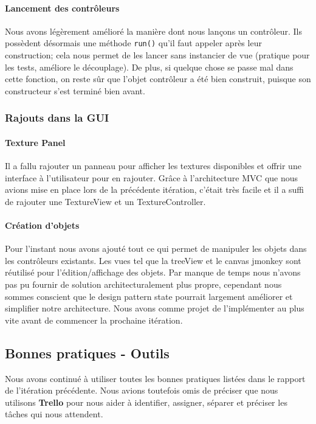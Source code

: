 		\paragraph{Lancement des contrôleurs}
		Nous avons légèrement amélioré la manière dont nous lançons un contrôleur.
		Ils possèdent désormais une méthode \texttt{run()} qu'il faut appeler
		après leur construction; cela nous permet de les lancer sans instancier
		de vue (pratique pour les tests, améliore le découplage). De plus, si 
		quelque chose se passe mal dans cette fonction, on reste sûr que 
		l'objet contrôleur a été bien construit, puisque son constructeur s'est
		terminé bien avant. 

	\subsubsection{Rajouts dans la GUI}

		\paragraph{Texture Panel}
		Il a fallu rajouter un panneau pour afficher les textures disponibles et
		offrir une interface à l'utilisateur pour en rajouter. Grâce à 
		l'architecture MVC que nous avions mise en place lors de la précédente 
		itération, c'était très facile et il a suffi de rajouter une TextureView
		et un TextureController.

		\paragraph{Création d'objets}
		Pour l'instant nous avons ajouté tout ce qui permet de manipuler les objets dans les contrôleurs existants. Les vues tel que la treeView et le canvas jmonkey sont réutilisé pour l'édition/affichage des objets. Par manque de temps nous n'avons pas pu fournir de solution architecturalement plus propre, cependant nous sommes conscient que le design pattern state pourrait largement améliorer et simplifier notre architecture. Nous avons comme projet de l'implémenter au plus vite avant de commencer la prochaine itération.


\subsection{Bonnes pratiques - Outils}

Nous avons continué à utiliser toutes les bonnes pratiques listées dans le
rapport de l'itération précédente. Nous avions toutefois omis de préciser que
nous utilisons \textbf{Trello} pour nous aider à identifier, assigner, séparer 
et préciser les tâches qui nous attendent. 

